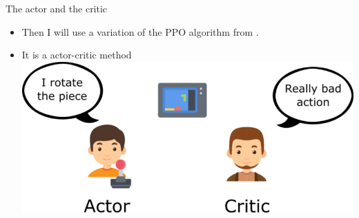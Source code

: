 \documentclass[10pt]{beamer}
\begin{document}
\begin{frame}{The actor and the critic}
  \begin{itemize}[<+- | alert@+>]
    \item Then I will use a variation of the PPO algorithm from \citet{schulman2017proximal}. 
    \item It is a actor-critic method\\
      \vspace{20pt}
      \centering
      \includegraphics[scale=0.3]{images/actor-critc.png}
  \end{itemize}
\end{frame}
\end{document}
